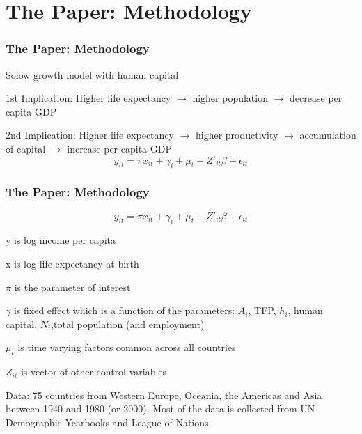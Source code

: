 \documentclass{beamer}
\begin{document}
\section{The Paper: Methodology}
\begin{frame}
\frametitle{The Paper: Methodology}
\begin{Itemize}
\item Solow growth model with human capital
\item 1st Implication: Higher life expectancy $\rightarrow$ higher population $\rightarrow$ decrease per capita GDP 
\item 2nd Implication: Higher life expectancy $\rightarrow$ higher productivity $\rightarrow$ accumulation of capital $\rightarrow$ increase per capita GDP 
\begin{equation}
y_{it}=\pi x_{it}+ \gamma_{i} + \mu_{t} + Z'_{it}\beta + \epsilon_{it} \nonumber
\end{equation}
\end{Itemize}
\end{frame}

\begin{frame}
\frametitle{The Paper: Methodology}
\begin{equation}
y_{it}=\pi x_{it}+ \gamma_{i} + \mu_{t} + Z'_{it}\beta + \epsilon_{it}
\end{equation}
\begin{Itemize}
\item y is log income per capita
\item x is log life expectancy at birth
\item $\pi$ is the parameter of interest
\item $\gamma$ is fixed effect which is a function of the parameters: $A_{i}$, TFP, $h_{i}$, human capital, $N_{i}$,total population (and employment)
\item $\mu_{t}$ is time varying factors common across all countries
\item $Z_{it}$ is vector of other control variables
\item Data: 75 countries from Western Europe, Oceania, the Americas and Asia between 1940 and 1980 (or 2000). Most of the data is collected from UN Demographic Yearbooks and League of Nations.
\end{Itemize}
\end{frame}
\end{document}

